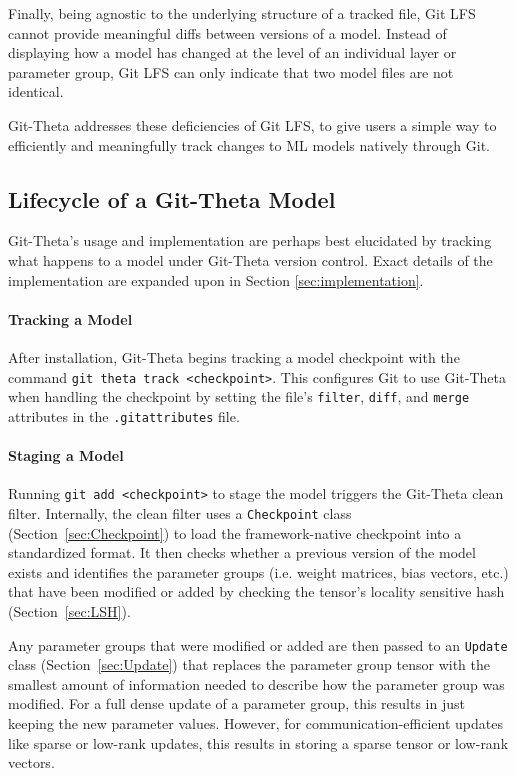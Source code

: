 \documentclass[nohyperref]{article}
\def\code#1{\texttt{#1}}
\theoremstyle{plain}
\theoremstyle{definition}
\theoremstyle{remark}
\begin{document}
Finally, being agnostic to the underlying structure of a tracked file, Git LFS cannot provide meaningful diffs between versions of a model. Instead of displaying how a model has changed at the level of an individual layer or parameter group, Git LFS can only indicate that two model files are not identical.

Git-Theta addresses these deficiencies of Git LFS, to give users a simple way to efficiently and meaningfully track changes to ML models natively through Git. 

\subsection{Lifecycle of a Git-Theta Model}
Git-Theta's usage and implementation are perhaps best elucidated by tracking what happens to a model under Git-Theta version control. Exact details of the implementation are expanded upon in Section \ref{sec:implementation}.
\paragraph{Tracking a Model}
After installation, Git-Theta begins tracking a model checkpoint with the command \code{git theta track <checkpoint>}. This configures Git to use Git-Theta when handling the checkpoint by setting the file's \code{filter}, \code{diff}, and \code{merge} attributes in the \code{.gitattributes} file. 

\paragraph{Staging a Model}
Running \code{git add <checkpoint>} to stage the model triggers the Git-Theta clean filter. Internally, the clean filter uses a \code{Checkpoint} class (Section~\ref{sec:Checkpoint}) to load the framework-native checkpoint into a standardized format. It then checks whether a previous version of the model exists and identifies the parameter groups (i.e. weight matrices, bias vectors, etc.) that have been modified or added by checking the tensor's locality sensitive hash (Section~\ref{sec:LSH}).

Any parameter groups that were modified or added are then passed to an \code{Update} class (Section~\ref{sec:Update}) that replaces the parameter group tensor with the smallest amount of information needed to describe how the parameter group was modified. For a full dense update of a parameter group, this results in just keeping the new parameter values. However, for communication-efficient updates like sparse or low-rank updates, this results in storing a sparse tensor or low-rank vectors.
\end{document}
